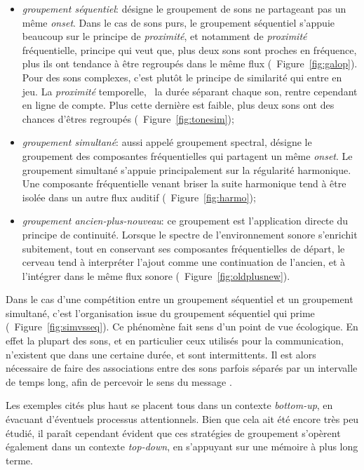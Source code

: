 \begin{itemize}
\item \emph{groupement séquentiel}: désigne le groupement de sons ne partageant pas un même \emph{onset}. Dans le cas de sons purs, le groupement séquentiel s'appuie beaucoup sur le principe de \emph{proximité}, et notamment de \emph{proximité} fréquentielle, principe qui veut que, plus deux sons sont proches en fréquence, plus ils ont tendance à être regroupés dans le même flux (\cf~Figure~\ref{fig:galop}). Pour des sons complexes, c'est plutôt le principe de similarité qui entre en jeu. La \emph{proximité} temporelle, \ie~la durée séparant chaque son, rentre cependant en ligne de compte. Plus cette dernière est faible, plus deux sons ont des chances d'êtres regroupés (\cf~Figure~\ref{fig:tonesim});
\item \emph{groupement simultané}: aussi appelé groupement spectral, désigne le groupement des composantes fréquentielles qui partagent un même \emph{onset}. Le groupement simultané s'appuie principalement sur la régularité harmonique. Une composante fréquentielle venant briser la suite harmonique tend à être isolée dans un autre flux auditif (\cf~Figure~\ref{fig:harmo});
\item \emph{groupement ancien-plus-nouveau}: ce groupement est l'application directe du principe de continuité. Lorsque le spectre de l'environnement sonore s'enrichit subitement, tout en conservant ses composantes fréquentielles de départ, le cerveau tend à interpréter l'ajout comme une continuation de l'ancien, et à l'intégrer dans le même flux sonore (\cf~Figure~\ref{fig:oldplusnew}).
\end{itemize}

Dans le cas d'une compétition entre un groupement séquentiel et un groupement simultané, c'est l'organisation issue du groupement séquentiel qui prime (\cf~Figure~\ref{fig:simvsseq}). Ce phénomène fait sens d'un point de vue écologique. En effet la plupart des sons, et en particulier ceux utilisés pour la communication, n'existent que dans une certaine durée, et sont intermittents. Il est alors nécessaire de faire des associations entre des sons parfois séparés par un intervalle de temps long, afin de percevoir le sens du message \citep{winkler2009modeling}.

Les exemples cités plus haut se placent tous dans un contexte \emph{bottom-up}, en évacuant d'éventuels processus attentionnels. Bien que cela ait été encore très peu étudié, il paraît cependant évident que ces stratégies de groupement s’opèrent également dans un contexte \emph{top-down}, en s'appuyant sur une mémoire à plus long terme.

